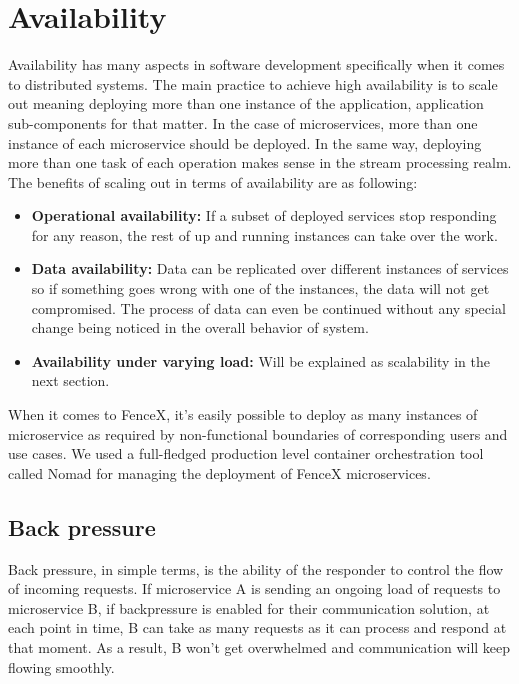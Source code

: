 \documentclass[a4]{report}
\begin{document}
    \section{Availability}
    Availability has many aspects in software development specifically when it comes to distributed systems.
    The main practice to achieve high availability is to scale out meaning deploying more than one instance of the application, application sub-components for that matter.
    In the case of microservices, more than one instance of each microservice should be deployed.
    In the same way, deploying more than one task of each operation makes sense in the stream processing realm.
    The benefits of scaling out in terms of availability are as following:
    \begin{itemize}
        \item \textbf{Operational availability:} If a subset of deployed services stop responding for any reason, the rest of up and running instances can take over the work.
        \item \textbf{Data availability:} Data can be replicated over different instances of services so if something goes wrong with one of the instances, the data will not get compromised.
        The process of data can even be continued without any special change being noticed in the overall behavior of system.
        \item \textbf{Availability under varying load:} Will be explained as scalability in the next section.
    \end{itemize}

    When it comes to FenceX, it's easily possible to deploy as many instances of microservice as required by
    non-functional boundaries of corresponding users and use cases.
    We used a full-fledged production level container orchestration tool called Nomad\cite{nomad} for managing the deployment of
    FenceX microservices.

    \subsection{Back pressure}
    Back pressure\cite{reactive-manifesto}, in simple terms, is the ability of the responder to control the flow of incoming requests.
    If microservice A is sending an ongoing load of requests to microservice B, if backpressure is enabled for
    their communication solution, at each point in time, B can take as many requests as it can process and respond at
    that moment.
    As a result, B won't get overwhelmed and communication will keep flowing smoothly.
\end{document}
